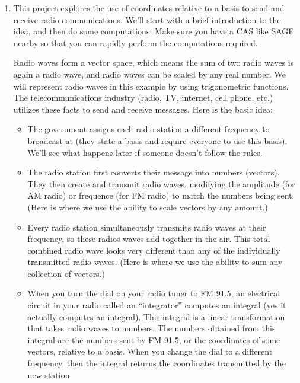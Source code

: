 \begin{enumerate}
\item This project explores the use of coordinates relative to a basis to send and receive radio communications.  We'll start with a brief introduction to the idea, and then do some computations. Make sure you have a CAS like SAGE nearby so that you can rapidly perform the computations required.

Radio waves form a vector space, which means the sum of two radio waves is again a radio wave, and radio waves can be scaled by any real number. We will represent radio waves in this example by using trigonometric functions. The telecommunications industry (radio, TV, internet, cell phone, etc.) utilizes these facts to send and receive messages.  Here is the basic idea:
\begin{itemize}
	\item The government assigns each radio station a different frequency to broadcast at (they state a basis and require everyone to use this basis). We'll see what happens later if someone doesn't follow the rules. 
	\item The radio station first converts their message into
          numbers (vectors). They
          then create and transmit radio waves, modifying the amplitude (for AM radio) or frequence (for FM radio) to match 
          the numbers being sent. (Here is where we use the ability to
          scale vectors by any amount.)
	\item Every radio station simultaneously transmits radio waves at their frequency, so these radios waves add together in the air. This total combined radio wave looks very different than any of the individually transmitted radio waves. (Here is where we use the ability to sum any collection of vectors.)
	\item When you turn the dial on your radio tuner to FM 91.5, an electrical circuit in your radio called an ``integrator'' computes an integral (yes it actually computes an integral). This integral is a linear transformation that takes radio waves to numbers. The numbers obtained from this integral are the numbers sent by FM 91.5, or the coordinates of some vectors, relative to a basis.  
	When you change the dial to a different frequency, then the integral returns the coordinates transmitted by the new station.	
\end{itemize}


\end{enumerate}

